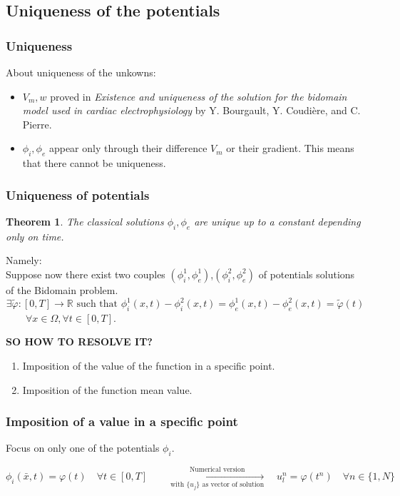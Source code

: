 \documentclass[9pt]{beamer}
\newtheorem*{theor}{Theorem}
\begin{document}
\begin{frame}
\section{Uniqueness of the potentials}
\frametitle{Uniqueness}
About uniqueness of the unkowns:
\vspace{2mm}
\begin{itemize}
\item $V_m, w$ proved in \textit{Existence and uniqueness of the solution for the bidomain model used in cardiac electrophysiology} by Y. Bourgault, Y. Coudière, and C. Pierre.
\vspace{2mm}
\item $\phi_i, \phi_e$ appear only through their difference $V_m$ or their gradient. This means that there cannot be uniqueness.
\end{itemize}
\end{frame}
\begin{frame}
\frametitle{Uniqueness of potentials}
\begin{theor}
The classical solutions $\phi_i,\phi_e$ are unique up to a constant depending only on time.
\end{theor}
Namely:\\
Suppose now there exist two couples $(\phi_i^1,\phi_e^1)$,$(\phi_i^2,\phi_e^2)$ of potentials solutions of the Bidomain problem.
\begin{equation*}
\exists \tilde{\varphi}:[0,T]\rightarrow \mathbb{R} \text{ such that } \phi_i^1(x,t)-\phi_i^2(x,t) = \phi_e^1(x,t)-\phi_e^2(x,t)= \tilde{\varphi}(t)
\end{equation*} 
$\qquad \forall x \in \Omega,\forall t \in [0,T].$
\begin{center}
\textbf{SO HOW TO RESOLVE IT?}
\end{center}
\begin{enumerate}
\item Imposition of the value of the function in a specific point.
\item Imposition of the function mean value.
\end{enumerate}
\end{frame}

\begin{frame}
\frametitle{Imposition of a value in a specific point}
Focus on only one of the potentials $\phi_i$.\\
\vspace{3mm}
\begin{small}
$\phi_i(\bar{x},t) = \varphi(t) \quad \forall t \in [0,T] \qquad
\xrightarrow[\text{with } \{u_j\} \text{ as vector of solution}]{\text{Numerical version}}\quad
u_l^n = \varphi(t^n) \quad \forall n \in \{1,N\}$
\end{small}
\vspace{2mm}
\end{frame}
\end{document}

